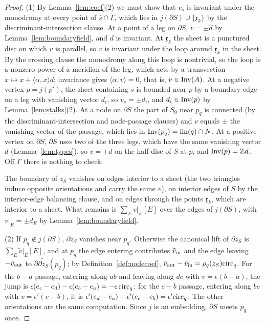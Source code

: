 \begin{proof}
(1) By Lemma~\ref{lem:coef}(2) we must show that $v_s$ is invariant under the monodromy at every point of
$\bar s\cap\Gamma$, which lies in $j(\partial S)\cup\{\mathfrak x_k\}$ by the discriminant-intersection clause. At a point of a leg on $\partial S$,
$v=\pm d$ by Lemma~\ref{lem:boundaryfield}, and $d$ is invariant. At $\mathfrak x_k$ the sheet is a punctured disc on
which $v$ is parallel, so $v$ is invariant under the loop around $\mathfrak x_k$ in the sheet. By the crossing clause the monodromy along
this loop is nontrivial, so the loop is a nonzero power of a meridian of the leg, which acts by a transvection
$x\mapsto x+\langle\alpha,x\rangle d$; invariance gives $\langle\alpha,v\rangle=0$, that is, $v\in\operatorname{Inv}(A)$. At a negative vertex $p=j(p')$, the sheet containing $s$
is bounded near $p$ by a boundary edge on a leg with vanishing vector $d_i$, so $v_s=\pm d_i$, and $d_i\in\operatorname{Inv}(p)$ by
Lemma~\ref{lem:stalks}(2). At a node on $\partial S$ the part of $S_0$ near $p_q$ is connected (by the discriminant-intersection and node-passage clauses) and $v$
equals $\pm$ the vanishing vector of the passage, which lies in $\operatorname{Inv}(p_q)=\operatorname{lin}(q)\cap N$. At a positive vertex on
$\partial S$, $\partial S$ uses two of the three legs, which have the same vanishing vector $d$ (Lemma~\ref{lem:types}),
so $v=\pm d$ on the half-disc of $S$ at $p$, and $\operatorname{Inv}(p)=\mathbb Z d$. Off $\Gamma$ there is nothing to check.

The boundary of $z_S$ vanishes on edges interior to a sheet (the two triangles induce opposite orientations and carry
the same $v$), on interior edges of $S$ by the interior-edge balancing clause, and on edges through the points $\mathfrak x_k$, which are interior to
a sheet. What remains is $\sum_Ev|_E[E]$ over the edges of $j(\partial S)$, with $v|_E=\pm d_E$ by
Lemma~\ref{lem:boundaryfield}.

(2) If $p_q\notin j(\partial S)$, $\partial z_S$ vanishes near $p_q$. Otherwise the canonical lift of $\partial z_S$ is
$\sum_E\tilde v|_E[E]$, and at $p_q$ the edge entering contributes $\tilde v_{\rm in}$ and the edge leaving
$-\tilde v_{\rm out}$ to $\partial\widetilde{\partial z_S}(p_q)$; by Definition~\ref{def:nodecoef},
$\tilde v_{\rm out}-\tilde v_{\rm in}=\rho_q(z_S)\mathrm{circ}_q$. For the $b-a$ passage, entering along $ab$ and leaving
along $dc$ with $v=\epsilon(b-a)$, the jump is $\epsilon(e_c-e_d)-\epsilon(e_b-e_a)=-\epsilon\,\mathrm{circ}_q$; for the $c-b$
passage, entering along $bc$ with $v=\epsilon'(c-b)$, it is $\epsilon'(e_d-e_a)-\epsilon'(e_c-e_b)=\epsilon'\mathrm{circ}_q$.
The other orientations are the same computation. Since $j$ is an embedding, $\partial S$ meets $p_q$ once.
\end{proof}

